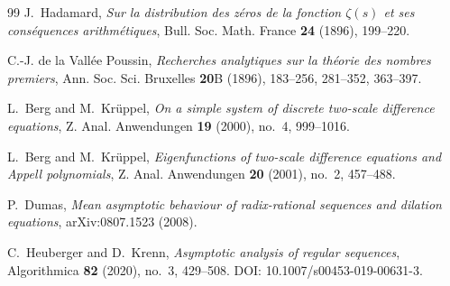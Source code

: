 \documentclass[11pt]{article}
\theoremstyle{definition}
\theoremstyle{remark}
\begin{document}
\begin{thebibliography}{99}
J.~Hadamard, \emph{Sur la distribution des z\'eros de la fonction $\zeta(s)$ et ses cons\'equences
arithm\'etiques}, Bull. Soc. Math. France \textbf{24} (1896), 199--220.

C.-J. de la Vall\'ee Poussin, \emph{Recherches analytiques sur la th\'eorie des nombres
premiers}, Ann. Soc. Sci. Bruxelles \textbf{20}B (1896), 183--256, 281--352, 363--397.

L.~Berg and M.~Kr\"uppel, \emph{On a simple system of discrete two-scale difference equations},
Z. Anal. Anwendungen \textbf{19} (2000), no.~4, 999--1016.

L.~Berg and M.~Kr\"uppel, \emph{Eigenfunctions of two-scale difference equations and Appell
polynomials}, Z. Anal. Anwendungen \textbf{20} (2001), no.~2, 457--488.

P.~Dumas, \emph{Mean asymptotic behaviour of radix-rational sequences and dilation equations},
arXiv:0807.1523 (2008).

C.~Heuberger and D.~Krenn, \emph{Asymptotic analysis of regular sequences}, Algorithmica
\textbf{82} (2020), no.~3, 429--508. DOI: 10.1007/s00453-019-00631-3.

\end{thebibliography}
\end{document}
